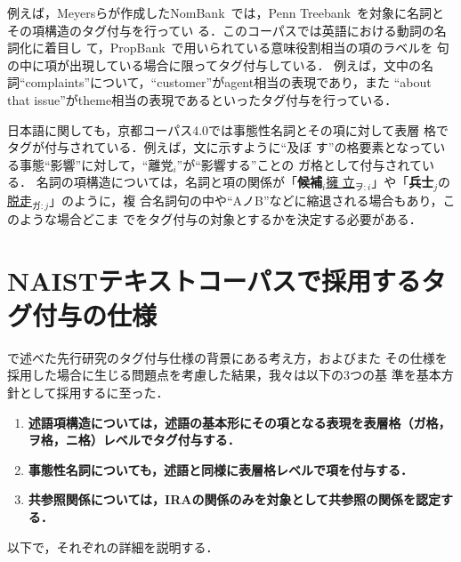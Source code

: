 \documentclass[japanese]{jnlp_1.4}
\def\sec#1{}
\begin{document}
例えば，Meyersらが作成したNomBank~\cite{Meyers:04}では，Penn
Treebank~\cite{Marcus:93}を対象に名詞とその項構造のタグ付与を行ってい
る．このコーパスでは英語における動詞の名詞化に着目し
て，PropBank~\cite{Palmer:05}で用いられている意味役割相当の項のラベルを
句の中に項が出現している場合に限ってタグ付与している．
例えば，文中の名詞``complaints''について，``customer''がagent相当の表現であり，また
``about that issue''がtheme相当の表現であるといったタグ付与を行っている．

日本語に関しても，京都コーパス4.0では事態性名詞とその項に対して表層
格でタグが付与されている．例えば，文に示すように``及ぼ
す''の格要素となっている事態``影響''に対して，``離党$_i$''が``影響する''ことの
ガ格として付与されている．
名詞の項構造については，名詞と項の関係が「\textbf{候補}$_i$\ul{擁
  立}$_{ヲ:i}$」や「\textbf{兵士}$_j$の\ul{脱走}$_{ガ:j}$」のように，複
合名詞句の中や``AノB''などに縮退される場合もあり，このような場合どこま
でをタグ付与の対象とするかを決定する必要がある．



\section{NAISTテキストコーパスで採用するタグ付与の仕様}
\label{sec:fourth}

\sec{third}で述べた先行研究のタグ付与仕様の背景にある考え方，およびまた
その仕様を採用した場合に生じる問題点を考慮した結果，我々は以下の3つの基
準を基本方針として採用するに至った．
\begin{enumerate}
\item \textbf{述語項構造については，述語の基本形にその項となる表現を表層格（ガ格，ヲ格，ニ格）レベルでタグ付与する．}
\item \textbf{事態性名詞についても，述語と同様に表層格レベルで項を付与する．}
\item \textbf{共参照関係については，IRAの関係のみを対象として共参照の関係を認定する．}
\end{enumerate}
以下で，それぞれの詳細を説明する．
\end{document}
